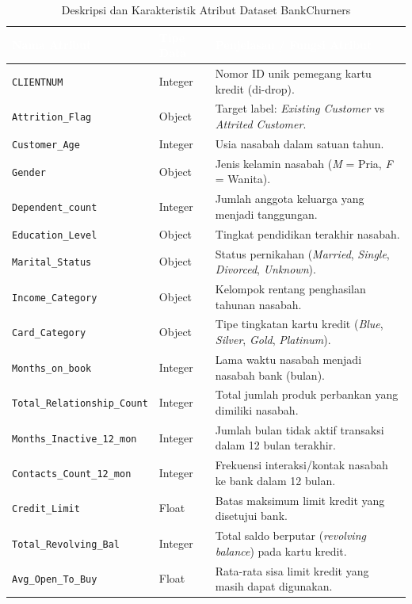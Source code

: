 \documentclass[a4paper,oneside,12pt]{report}
\newcommand{\thead}[1]{\textcolor{white}{\textbf{#1}}}
\begin{document}
\begin{enumerate}
\begin{table}[H]
\centering
\caption{Deskripsi dan Karakteristik Atribut Dataset BankChurners}
\label{tab:bank_churners_attributes}
\footnotesize
{}
\begin{tabularx}{\textwidth}{l l X}
\toprule
\rowcolor{darkblue}
\thead{Nama Atribut} & \thead{Tipe Data} & \thead{Penjelasan / Fungsi Atribut} \\
\midrule
\texttt{CLIENTNUM} & Integer & Nomor ID unik pemegang kartu kredit (di-drop). \\
\texttt{Attrition\_Flag} & Object & Target label: \textit{Existing Customer} vs \textit{Attrited Customer}. \\
\texttt{Customer\_Age} & Integer & Usia nasabah dalam satuan tahun. \\
\texttt{Gender} & Object & Jenis kelamin nasabah (\textit{M} = Pria, \textit{F} = Wanita). \\
\texttt{Dependent\_count} & Integer & Jumlah anggota keluarga yang menjadi tanggungan. \\
\texttt{Education\_Level} & Object & Tingkat pendidikan terakhir nasabah. \\
\texttt{Marital\_Status} & Object & Status pernikahan (\textit{Married}, \textit{Single}, \textit{Divorced}, \textit{Unknown}). \\
\texttt{Income\_Category} & Object & Kelompok rentang penghasilan tahunan nasabah. \\
\texttt{Card\_Category} & Object & Tipe tingkatan kartu kredit (\textit{Blue}, \textit{Silver}, \textit{Gold}, \textit{Platinum}). \\
\texttt{Months\_on\_book} & Integer & Lama waktu nasabah menjadi nasabah bank (bulan). \\
\texttt{Total\_Relationship\_Count} & Integer & Total jumlah produk perbankan yang dimiliki nasabah. \\
\texttt{Months\_Inactive\_12\_mon} & Integer & Jumlah bulan tidak aktif transaksi dalam 12 bulan terakhir. \\
\texttt{Contacts\_Count\_12\_mon} & Integer & Frekuensi interaksi/kontak nasabah ke bank dalam 12 bulan. \\
\texttt{Credit\_Limit} & Float & Batas maksimum limit kredit yang disetujui bank. \\
\texttt{Total\_Revolving\_Bal} & Integer & Total saldo berputar (\textit{revolving balance}) pada kartu kredit. \\
\texttt{Avg\_Open\_To\_Buy} & Float & Rata-rata sisa limit kredit yang masih dapat digunakan. \\

\end{tabularx}
\end{table}
\end{enumerate}
\end{document}
